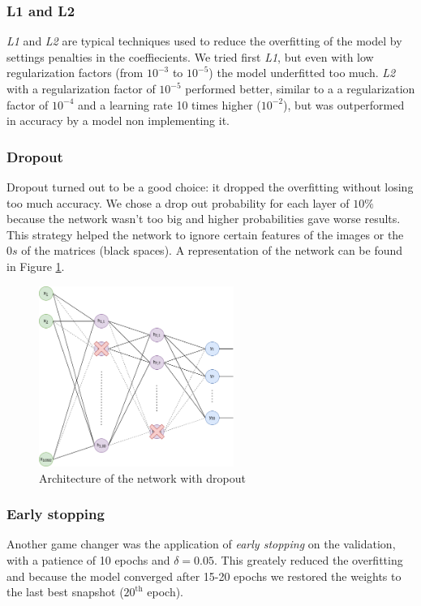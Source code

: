 \documentclass[compsoc]{IEEEtran}
\begin{document}
\subsubsection{L1 and L2}
\emph{L1} and \emph{L2} are typical techniques used to reduce the overfitting of the model by settings penalties in the coeffiecients. We tried first \emph{L1}, but even with low regularization factors (from $10^{-3}$ to $10^{-5}$) the model underfitted too much. \emph{L2} with a regularization factor of $10^{-5}$ performed better, similar to a a regularization factor of $10^{-4}$ and a learning rate 10 times higher ($10^{-2}$), but was outperformed in accuracy by a model non implementing it.

\subsubsection{Dropout}
Dropout turned out to be a good choice: it dropped the overfitting without losing too much accuracy. We chose a drop out probability for each layer of $10\%$ because the network wasn't too big and higher probabilities gave worse results. This strategy helped the network to ignore certain features of the images or the $0s$ of the matrices (black spaces). A representation of the network can be found in Figure \ref{fig:regffnn}. 

\begin{figure}[ht!]
\centering                                                                        
\includegraphics[width=2.5in]{regffnn.png}
\captionsetup{justification=centering}                                                                                                           
\caption{Architecture of the network with dropout}
\label{fig:regffnn}
\end{figure}

\subsubsection{Early stopping}
Another game changer was the application of \emph{early stopping} on the validation, with a patience of 10 epochs and $\delta = 0.05$. This greately reduced the overfitting and because the model converged after 15-20 epochs we restored the weights to the last best snapshot ($20^{\text{th}}$ epoch).
\end{document}
